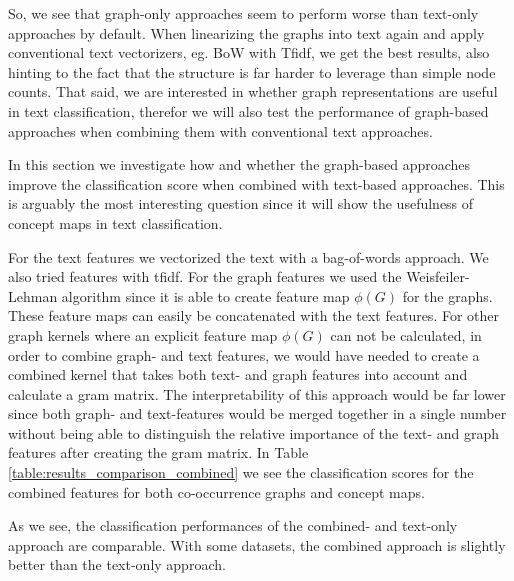 So, we see that graph-only approaches seem to perform worse than text-only approaches by default.
When linearizing the graphs into text again and apply conventional text vectorizers, eg. BoW with Tfidf, we get the best results, also hinting to the fact that the structure is far harder to leverage than simple node counts.
That said, we are interested in whether graph representations are useful in text classification, therefor we will also test the performance of graph-based approaches when combining them with conventional text approaches.


In this section we investigate how and whether the graph-based approaches improve the classification score when combined with text-based approaches.
This is arguably the most interesting question since it will show the usefulness of concept maps in text classification.

For the text features we vectorized the text with a bag-of-words approach. We also tried features with tfidf.
For the graph features we used the Weisfeiler-Lehman algorithm since it is able to create feature map $\phi(G)$ for the graphs.
These feature maps can easily be concatenated with the text features.
For other graph kernels where an explicit feature map $\phi(G)$ can not be calculated, in order to combine graph- and text features, we would have needed to create a combined kernel that takes both text- and graph features into account and calculate a gram matrix.
The interpretability of this approach would be far lower since both graph- and text-features would be merged together in a single number without being able to distinguish the relative importance of the text- and graph features after creating the gram matrix.
In Table \ref{table:results_comparison_combined} we see the classification scores for the combined features for both co-occurrence graphs and concept maps.

As we see, the classification performances of the combined- and text-only approach are comparable.
With some datasets, the combined approach is slightly better than the text-only approach.

